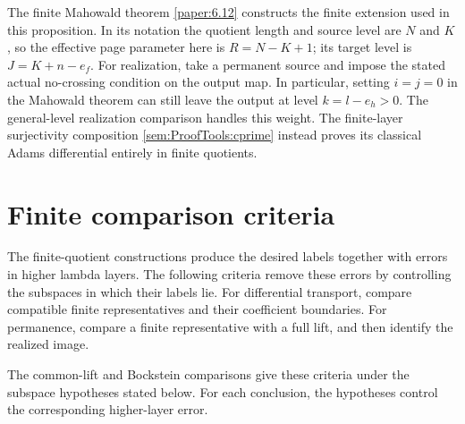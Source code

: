 The finite Mahowald theorem \ref{paper:6.12} constructs the finite
extension used in this proposition. In its notation the quotient
length and source level are $N$ and $K$, so the effective page
parameter here is $R=N-K+1$; its target level is
$J=K+n-e_f$. For realization, take a permanent source and impose the stated actual
no-crossing condition on the output map. In particular, setting
$i=j=0$ in the Mahowald theorem can still leave the output at
level $k=l-e_h>0$. The general-level realization comparison handles this weight. The finite-layer surjectivity composition
\ref{sem:ProofTools:cprime} instead proves its classical Adams
differential entirely in finite quotients.

\section{Finite comparison criteria}
\label{sec:ProofTools:computational-corollaries}

The finite-quotient constructions produce the desired labels together
with errors in higher lambda layers. The following criteria remove
these errors by controlling the subspaces in which their labels lie.
For differential transport, compare compatible finite representatives
and their coefficient boundaries. For permanence, compare a finite
representative with a full lift, and then identify the realized image.

The common-lift and Bockstein comparisons give these criteria under
the subspace hypotheses stated below. For each conclusion, the
hypotheses control the corresponding higher-layer error.


